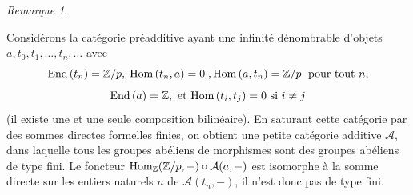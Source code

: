 \documentclass[a4paper,10pt]{article}
\newcommand{\A}{{\mathcal{A}}}
\newcommand{\B}{{\mathcal{B}}}
\newcommand{\F}{{\mathcal{F}}}
\newcommand{\col}{{\rm colim}\,}
\newtheorem{lm}[thm]{Lemme}
\theoremstyle{definition}
\theoremstyle{remark}
\newtheorem{rem}[thm]{Remarque}
\begin{document}
\begin{rem}
\begin{enumerate}
Considérons la catégorie préadditive ayant une infinité dénombrable d'objets $a, t_0, t_1, \dots,t_n,\dots$ avec
$${\rm End}\,(t_n)=\mathbb{Z}/p,\; {\rm Hom}\,(t_n,a)=0\;, {\rm Hom}\,(a,t_n)=\mathbb{Z}/p\;\text{ pour tout }n,$$
$${\rm End}\,(a)=\mathbb{Z}, \text{ et }{\rm Hom}\,(t_i,t_j)=0\text{ si }i\neq j$$
(il existe une et une seule composition bilinéaire). En saturant cette catégorie par des sommes directes formelles finies, on obtient une petite catégorie additive $\A$, dans laquelle tous les groupes abéliens de morphismes sont des groupes abéliens de type fini. Le foncteur ${\rm Hom}_\mathbb{Z}(\mathbb{Z}/p,-)\circ\A(a,-)$ est isomorphe à la somme directe sur les entiers naturels $n$ de $\A(t_n,-)$, il n'est donc pas de type fini.
\end{enumerate}

%
\end{rem}

%



\end{document}
